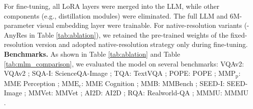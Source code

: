 For fine-tuning, all LoRA layers were merged into the LLM, while other components (e.g., distillation modules) were eliminated. The full LLM and 6M-parameter visual embedding layer were trainable. For native-resolution variants (\model{}-AnyRes in Table \ref{tab:ablation}), we retained the pre-trained weights of the fixed-resolution version and adopted native-resolution strategy only during fine-tuning.
\\
\textbf{Benchmarks.} As shown in Table \ref{tab:ablation} and Table \ref{tab:mlm_comparison}, we evaluated the model on several benchmarks: VQAv2: VQAv2 \cite{vqav2}; SQA-I: ScienceQA-Image \cite{scienceqa}; TQA: TextVQA \cite{textvqa}; POPE: POPE \cite{pope}; $\mathrm{MMP_p}$: MME Perception \cite{mme}; $\mathrm{MME_c}$: MME Cognition \cite{mme}; MMB: MMBench \cite{mmbench}; SEED-I: SEED-Image \cite{seed}; MMVet: MMVet \cite{mmvet}; AI2D: AI2D \cite{ai2d}; RQA: Realworld-QA \cite{grok1.5v}; MMMU: MMMU \cite{mmmu}.
